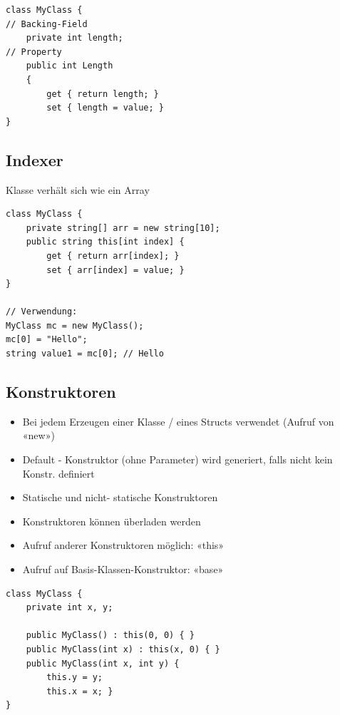 \begin{lstlisting}
class MyClass {
// Backing-Field
    private int length;
// Property
    public int Length
    {
        get { return length; }
        set { length = value; }
}
\end{lstlisting}
\subsection{Indexer}

Klasse verhält sich wie ein Array

\begin{lstlisting}
class MyClass {
    private string[] arr = new string[10];
    public string this[int index] {
        get { return arr[index]; }
        set { arr[index] = value; }
}

// Verwendung:
MyClass mc = new MyClass();
mc[0] = "Hello";
string value1 = mc[0]; // Hello
\end{lstlisting}


\subsection{Konstruktoren}
\begin{itemize}
    \item Bei jedem Erzeugen einer Klasse / eines Structs verwendet (Aufruf von «new»)
    \item Default - Konstruktor (ohne Parameter) wird generiert, falls nicht kein Konstr. definiert
    \item Statische und nicht- statische Konstruktoren
    \item Konstruktoren können überladen werden
    \item Aufruf anderer Konstruktoren möglich: «this»
    \item Aufruf auf Basis-Klassen-Konstruktor: «base»
\end{itemize}

\begin{lstlisting}
class MyClass {
    private int x, y;

    public MyClass() : this(0, 0) { }
    public MyClass(int x) : this(x, 0) { }
    public MyClass(int x, int y) {
        this.y = y;
        this.x = x; }
}
\end{lstlisting}
